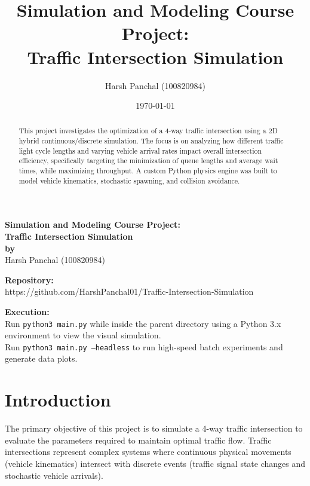 \documentclass[12pt, letterpaper, twoside]{article}
\title{\textbf{Simulation and Modeling Course Project:\\Traffic Intersection Simulation}} %
\author{Harsh Panchal (100820984)}
\date{\today}
\begin{document}
\begin{center}
    {\Large \textbf{Simulation and Modeling Course Project:\\Traffic Intersection Simulation}}\\
    \vspace{0.5cm}
    \textbf{by}\\
    \vspace{0.5cm}
    Harsh Panchal (100820984)\\
    \vspace{1cm}
\end{center}

\begin{abstract}
    \noindent
    This project investigates the optimization of a 4-way traffic intersection using a 2D hybrid continuous/discrete simulation. The focus is on analyzing how different traffic light cycle lengths and varying vehicle arrival rates impact overall intersection efficiency, specifically targeting the minimization of queue lengths and average wait times, while maximizing throughput. A custom Python physics engine was built to model vehicle kinematics, stochastic spawning, and collision avoidance.
\end{abstract}

\vspace{1.5cm}

\textbf{Repository:}\\
https://github.com/HarshPanchal01/Traffic-Intersection-Simulation

\textbf{Execution:}\\
Run \texttt{python3 main.py} while inside the parent directory using a Python 3.x environment to view the visual simulation.\\
Run \texttt{python3 main.py --headless} to run high-speed batch experiments and generate data plots.

\thispagestyle{firstpage}
\pagebreak


\newgeometry{} %

\section{Introduction}
\label{sec:intro}
The primary objective of this project is to simulate a 4-way traffic intersection to evaluate the parameters required to maintain optimal traffic flow. Traffic intersections represent complex systems where continuous physical movements (vehicle kinematics) intersect with discrete events (traffic signal state changes and stochastic vehicle arrivals). 
\end{document}

